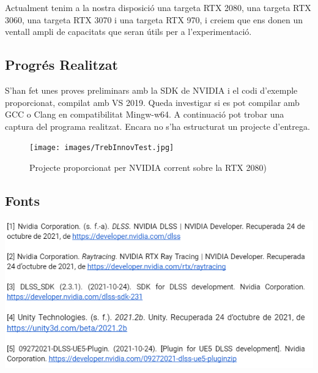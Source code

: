 \documentclass[a4paper]{article}
\begin{document}
Actualment tenim a la nostra disposició una targeta RTX 2080, una targeta RTX 3060, una targeta RTX 3070 i una targeta RTX 970, i creiem que ens donen un ventall ampli de capacitats que seran útils per a l'experimentació.

\newpage

\subsection{Progrés Realitzat}
S'han fet unes proves preliminars amb la SDK de NVIDIA i el codi d'exemple proporcionat, compilat amb VS 2019. Queda investigar si es pot compilar amb GCC o Clang en compatibilitat Mingw-w64. A continuació pot trobar una captura del programa realitzat. Encara no s'ha estructurat un projecte d'entrega.

\begin{figure}[htp]
\centering
\texttt{[image: images/TrebInnovTest.jpg]}
\caption{Projecte proporcionat per NVIDIA corrent sobre la RTX 2080)}
\centering
\end{figure}

\subsection{Fonts}

\includegraphics[scale=0.95]{images/fonts.PNG}
\end{document}
